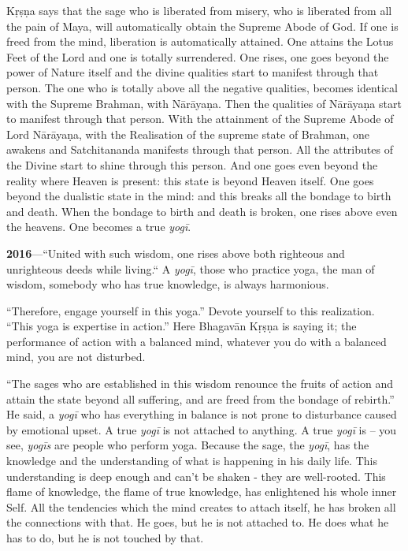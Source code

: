 Kṛṣṇa says that the sage who is liberated from misery, who is liberated from all the pain of Maya, will automatically obtain the Supreme Abode of God. If one is freed from the mind, liberation is automatically attained. One attains the Lotus Feet of the Lord and one is totally surrendered. One rises, one goes beyond the power of Nature itself and the divine qualities start to manifest through that person. The one who is totally above all the negative qualities, becomes identical with the Supreme Brahman, with Nārāyaṇa. Then the qualities of Nārāyaṇa start to manifest through that person. With the attainment of the Supreme Abode of Lord Nārāyaṇa, with the Realisation of the supreme state of Brahman, one awakens and Satchitananda manifests through that person. All the attributes of the Divine start to shine through this person. And one goes even beyond the reality where Heaven is present: this state is beyond Heaven itself. One goes beyond the dualistic state in the mind: and this breaks all the bondage to birth and death. When the bondage to birth and death is broken, one rises above even the heavens. One becomes a true \textit{yogī}.

\textbf{2016}---“United with such wisdom, one rises above both righteous and unrighteous deeds while living.“ A \textit{yogī}, those who practice yoga, the man of wisdom, somebody who has true knowledge, is always harmonious.

“Therefore, engage yourself in this yoga.” Devote yourself to this realization. “This yoga is expertise in action.” Here Bhagavān Kṛṣṇa is saying it; the performance of action with a balanced mind, whatever you do with a balanced mind, you are not disturbed.

“The sages who are established in this wisdom renounce the fruits of action and attain the state beyond all suffering, and are freed from the bondage of rebirth.” He said, a \textit{yogī} who has everything in balance is not prone to disturbance caused by emotional upset. A true \textit{yogī} is not attached to anything. A true \textit{yogī} is – you see, \textit{yogīs} are people who perform yoga. Because the sage, the \textit{yogī}, has the knowledge and the understanding of what is happening in his daily life. This understanding is deep enough and can’t be shaken - they are well-rooted. This flame of knowledge, the flame of true knowledge, has enlightened his whole inner Self. All the tendencies which the mind creates to attach itself, he has broken all the connections with that. He goes, but he is not attached to. He does what he has to do, but he is not touched by that.

